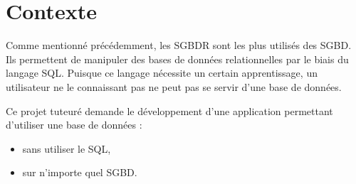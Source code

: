 \section{Contexte}
Comme mentionné précédemment, les SGBDR sont les plus utilisés des SGBD. Ils permettent de manipuler des bases de données relationnelles
par le biais du langage SQL. Puisque ce langage nécessite un certain apprentissage, un utilisateur ne le connaissant pas ne peut pas se servir
d'une base de données.

Ce projet tuteuré demande le développement d'une application permettant d'utiliser une base de données :
\begin{itemize}
\item sans utiliser le SQL,
\item sur n'importe quel SGBD.
\end{itemize}
